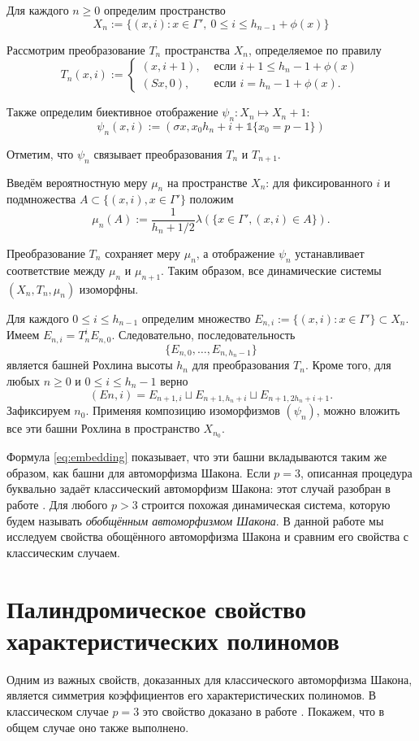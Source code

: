 \documentclass[14pt, a4paper, russian]{report}
\begin{document}
Для каждого $n \ge 0$ определим пространство
$$X_n:=\{(x,i): x \in \Gamma',\ 0 \le i \le h_{n-1} + \phi(x)\}$$

Рассмотрим преобразование $T_n$ пространства $X_n$, определяемое по правилу
$$T_n(x, i) := \begin{cases}
(x,i+1), & \text{ если } i+1 \le h_n - 1 + \phi(x) \\
(Sx,0), & \text{ если } i=h_n-1+\phi(x). \end{cases}$$

Также определим биективное отображение $\psi_n : X_n \mapsto X_n+1$:
$$\psi_n(x,i):=(\sigma x, x_0 h_n + i + \mathbb{1}\{x_0=p-1\})$$

Отметим, что $\psi_n$ связывает преобразования $T_n$ и
$T_{n+1}$.

Введём вероятностную меру $\mu_n$ на пространстве $X_n$: для фиксированного $i$ и подмножества
$A \subset \{(x, i), x\in\Gamma' \}$ положим
$$\mu_n(A):=\frac{1}{h_n + 1/2} \lambda (\{x \in \Gamma', (x, i) \in A\}).$$

Преобразование $T_n$ сохраняет меру $\mu_n$, а отображение $\psi_n$ устанавливает соответствие между $\mu_n$ и $\mu_{n+1}$. Таким образом, все динамические системы $(X_n, T_n, \mu_n)$ изоморфны.

Для каждого $ 0 \le i \le h_{n-1}$ определим множество
$E_{n,i} := \{(x, i) : x \in \Gamma'\} \subset X_n$. Имеем $E_{n,i} = T^i_n E_{n,0}$. Следовательно, последовательность
 $$\{E_{n,0},\ldots,E_{n,h_n-1}\}$$
является башней Рохлина высоты $h_n$ для преобразования $T_n$. Кроме того, для любых $n \ge 0$ и $0 \le i \le h_n-1$ верно 
\begin{equation}\label{eq:embedding}
(En,i) = E_{n+1,i} \sqcup E_{n+1,h_n+i} \sqcup E_{n+1,2h_n+i+1}.
\end{equation}
Зафиксируем $n_0$. Применяя композицию изоморфизмов $(\psi_n)$, можно вложить все эти башни Рохлина в пространство $X_{n_0}$. 

Формула \ref{eq:embedding} показывает, что эти башни вкладываются таким же образом, как башни для автоморфизма Шакона. Если $p=3$, описанная процедура буквально задаёт классический автоморфизм Шакона: этот случай разобран в работе \cite{weaklimits}. Для любого $p > 3$ строится похожая динамическая система, которую будем называть \emph{обобщённым автоморфизмом Шакона}. В данной работе мы исследуем свойства обощённого автоморфизма Шакона и сравним его свойства с классическим случаем.

\chapter{Палиндромическое свойство характеристических полиномов}
Одним из важных свойств, доказанных для классического автоморфизма Шакона, является симметрия коэффициентов его характеристических полиномов. В классическом случае $p=3$  это свойство доказано в работе \cite{weaklimits}. Покажем, что в общем случае оно также выполнено.
\end{document}
